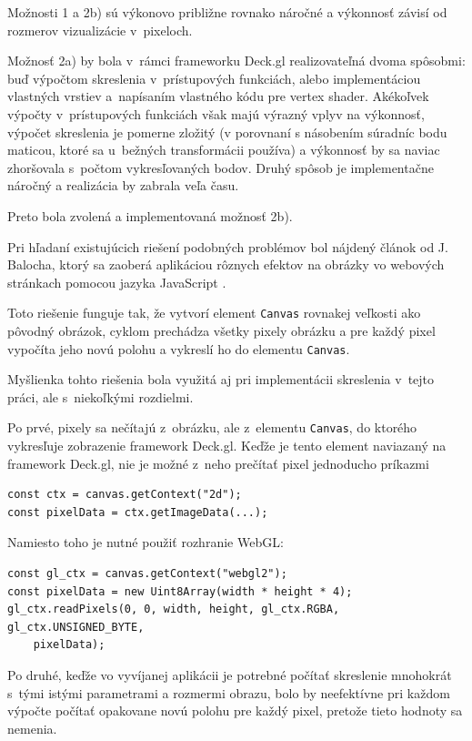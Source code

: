 Možnosti 1 a 2b) sú výkonovo približne rovnako náročné a výkonnosť závisí od rozmerov vizualizácie v~pixeloch.

Možnosť 2a) by bola v~rámci frameworku Deck.gl realizovateľná dvoma spôsobmi: buď výpočtom skreslenia v~prístupových funkciách, alebo implementáciou vlastných vrstiev a~napísaním vlastného kódu pre vertex shader. Akékoľvek výpočty v~prístupových funkciách však majú výrazný vplyv na výkonnosť, výpočet skreslenia je pomerne zložitý (v porovnaní s násobením súradníc bodu maticou, ktoré sa u~bežných transformácii používa) a výkonnosť by sa naviac zhoršovala s~počtom vykresľovaných bodov. Druhý spôsob je implementačne náročný a realizácia by zabrala veľa času.

Preto bola zvolená a implementovaná možnosť 2b).

Pri hľadaní existujúcich riešení podobných problémov bol nájdený článok od J. Balocha, ktorý sa zaoberá aplikáciou rôznych efektov na obrázky vo webových stránkach pomocou jazyka JavaScript \cite{baloch_distortion_in_js}.

Toto riešenie funguje tak, že vytvorí element \texttt{Canvas} rovnakej veľkosti ako pôvodný obrázok, cyklom prechádza všetky pixely obrázku a pre každý pixel vypočíta jeho novú polohu a vykreslí ho do elementu \texttt{Canvas}.

Myšlienka tohto riešenia bola využitá aj pri implementácii skreslenia v~tejto práci, ale s~niekoľkými rozdielmi.

Po prvé, pixely sa nečítajú z~obrázku, ale z~elementu \texttt{Canvas}, do ktorého vykresľuje zobrazenie framework Deck.gl. Keďže je tento element naviazaný na framework Deck.gl, nie je možné z~neho prečítať pixel jednoducho príkazmi 

\begin{lstlisting}
const ctx = canvas.getContext("2d");
const pixelData = ctx.getImageData(...);
\end{lstlisting}

Namiesto toho je nutné použiť rozhranie WebGL:

\begin{lstlisting}
const gl_ctx = canvas.getContext("webgl2");
const pixelData = new Uint8Array(width * height * 4);
gl_ctx.readPixels(0, 0, width, height, gl_ctx.RGBA, gl_ctx.UNSIGNED_BYTE, 
    pixelData);
\end{lstlisting}

Po druhé, keďže vo vyvíjanej aplikácii je potrebné počítať skreslenie mnohokrát s~tými istými parametrami a rozmermi obrazu, bolo by neefektívne pri každom výpočte počítať opakovane novú polohu pre každý pixel, pretože tieto hodnoty sa nemenia.

